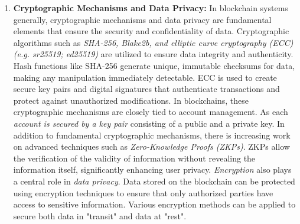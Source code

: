 \begin{enumerate}[label=(\arabic*)]
	\item\textbf{Cryptographic Mechanisms and Data Privacy:}\cite{sub_crypto}\cite{zkp_pub_85}
	In blockchain systems generally, cryptographic mechanisms and data privacy are fundamental elements that ensure the security and confidentiality of data. Cryptographic algorithms such as \textit{SHA-256, Blake2b, and elliptic curve cryptography (ECC) (e.g. sr25519; ed25519)} are utilized to ensure data integrity and authenticity. Hash functions like SHA-256 generate unique, immutable checksums for data, making any manipulation immediately detectable. ECC is used to create secure key pairs and digital signatures that authenticate transactions and protect against unauthorized modifications.
	In blockchains, these cryptographic mechanisms are closely tied to account management. As each \textit{account is secured by a key pair} consisting of a public and a private key. In addition to fundamental cryptographic mechanisms, there is increasing work on advanced techniques such as \textit{Zero-Knowledge Proofs (ZKPs)}. ZKPs allow the verification of the validity of information without revealing the information itself, significantly enhancing user privacy.
	\textit{Encryption} also plays a central role in \textit{data privacy}. Data stored on the blockchain can be protected using encryption techniques to ensure that only authorized parties have access to sensitive information. Various encryption methods can be applied to secure both data in "transit" and data at "rest".


\end{enumerate}
